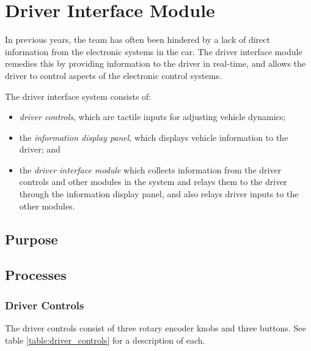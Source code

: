 \section{Driver Interface Module\label{sec:Driver-Interface-Module}}


In previous years, the team has often been hindered by a lack of direct information from the electronic systems in the car. The driver interface module remedies this by providing information to the driver in real-time, and allows the driver to control aspects of the electronic control systems.

The driver interface system consists of:

\begin{itemize}
\item \emph{driver controls}, which are tactile inputs for adjusting vehicle dynamics; 
\item the \emph{information display panel}, which displays vehicle information to the driver; and
\item the \emph{driver interface module} which collects information from the driver controls and other modules in the system and relays them to the driver through the information display panel, and also relays driver inputs to the other modules.
\end{itemize}


\subsection{Purpose}


\subsection{Processes}


\subsubsection{Driver Controls}
The driver controls consist of three rotary encoder knobs and three buttons. See table \ref{table:driver_controls} for a description of each.

